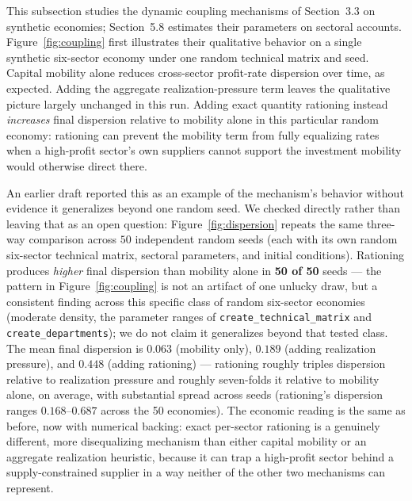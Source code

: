 \documentclass[11pt]{article}
\begin{document}
This subsection studies the dynamic coupling mechanisms of Section~3.3
on synthetic economies; Section~5.8 estimates their parameters on
sectoral accounts. Figure~\ref{fig:coupling}
first illustrates their qualitative behavior on a single synthetic
six-sector economy under one random technical matrix and seed. Capital
mobility alone reduces cross-sector profit-rate dispersion over time, as
expected. Adding the aggregate realization-pressure term leaves the
qualitative picture largely unchanged in this run. Adding exact quantity
rationing instead \emph{increases} final dispersion relative to mobility
alone in this particular random economy: rationing can prevent the
mobility term from fully equalizing rates when a high-profit sector's
own suppliers cannot support the investment mobility would otherwise
direct there.

An earlier draft reported this as an example of the mechanism's
behavior without evidence it generalizes beyond one random seed. We
checked directly rather than leaving that as an open question:
Figure~\ref{fig:dispersion} repeats the same three-way comparison across
$50$ independent random seeds (each with its own random six-sector
technical matrix, sectoral parameters, and initial conditions). Rationing
produces \emph{higher} final dispersion than mobility alone in
\textbf{50 of 50} seeds --- the pattern in Figure~\ref{fig:coupling} is
not an artifact of one unlucky draw, but a consistent finding across
this specific class of random six-sector economies (moderate density,
the parameter ranges of \texttt{create\_technical\_matrix} and
\texttt{create\_departments}); we do not claim it generalizes beyond
that tested class. The mean final dispersion is
$0.063$ (mobility only), $0.189$ (adding realization pressure), and
$0.448$ (adding rationing) --- rationing roughly triples dispersion
relative to realization pressure and roughly seven-folds it relative to
mobility alone, on average, with substantial spread across seeds
(rationing's dispersion ranges $0.168$--$0.687$ across the 50 economies).
The economic reading is the same as before, now with numerical backing:
exact per-sector rationing is a genuinely different, more disequalizing
mechanism than either capital mobility or an aggregate realization
heuristic, because it can trap a high-profit sector behind a
supply-constrained supplier in a way neither of the other two mechanisms
can represent.
\end{document}
